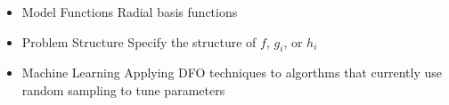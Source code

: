 \documentclass{article} %
\begin{document}
\begin{itemize}
\item Model Functions
	Radial basis functions
\item Problem Structure
	Specify the structure of $f$, $g_i$, or $h_i$
\item Machine Learning
	Applying DFO techniques to algorthms that currently use random sampling to tune parameters
\end{itemize}






% 
% 


















%
%
\end{document}

